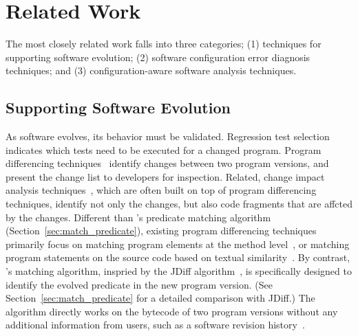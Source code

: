 \section{Related Work}
\label{sec:related}

The most closely related work falls into
three categories; (1) techniques for
supporting software evolution; (2) software
configuration error diagnosis techniques;
and (3) configuration-aware software analysis techniques.

\subsection{Supporting Software Evolution}

As software evolves, its behavior must be validated.
Regression test selection~\cite{regression}
indicates which tests need to be executed for a changed
program.  Program differencing techniques~\cite{Giroux:2006:DIF, Xing:2005:UAO, Thummalapenta:2010:ESM, Kim:2013, Jin:2012:BRF,Nguyen:2010:RBF,Dig:2006:ADR, Kamiya:2002:CMT, Dagenais:2008}
identify changes between two program versions,
and present the change list to developers for inspection.
Related, change impact analysis techniques~\cite{STVR:STVR1475}, which
are often built on top of program differencing
techniques, identify not only the changes, but also
code fragments that are affcted by the changes. 
Different than \ourtool's predicate matching
algorithm (Section~\ref{sec:match_predicate}),
existing program differencing techniques primarily focus on matching
program elements at the method level~\cite{frameworkevolution,
Xing:2005:UAO, Kim:2013, Nguyen:2010:RBF,Dig:2006:ADR,
Kamiya:2002:CMT, Dagenais:2008},
or matching program statements on the source code based on
textual similarity~\cite{Horwitz:1990:IST}.
By contrast, \ourtool's matching algorithm, inspried by
the JDiff algorithm~\cite{Apiwattanapong:2004}, is specifically designed 
to identify the evolved predicate in the new program version.
(See Section~\ref{sec:match_predicate} for a detailed
comparison with JDiff.)
The algorithm directly works on the bytecode of two program
versions without any additional information from users,
such as a software revision history~\cite{frameworkevolution}.


